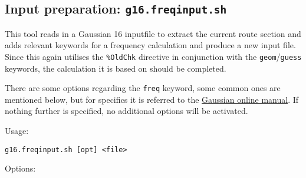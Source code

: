 \documentclass[   %
  final,          %
  a4paper         %
]{article}
\begin{document}
\subsection{Input preparation: \texorpdfstring{{\lstinline`g16.freqinput.sh`}}{g16.freqinput.sh}}
\label{sec:g16.freqinput}

This tool reads in a Gaussian 16 inputfile to extract the current route section
and adds relevant keywords for a frequency calculation and produce a new input file.
Since this again utilises the \texttt{\%OldChk} directive in conjunction with 
the \texttt{geom}/\texttt{guess} keywords, the calculation it is based on should be completed.

There are some options regarding the \texttt{freq} keyword, some common ones are mentioned below,
but for specifics it is referred to the \href{http://gaussian.com/freq/}{Gaussian online manual}.
If nothing further is specified, no additional options will be activated.

Usage: 

\lstinline`g16.freqinput.sh [opt] <file>`

Options:
\end{document}
